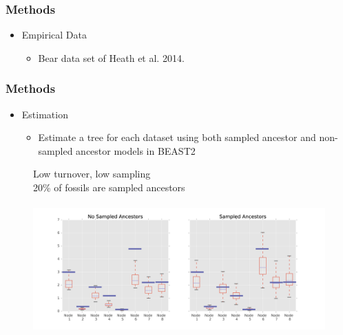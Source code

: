 \documentclass[]{beamer}
\begin{document}
\begin{frame}
\frametitle{Methods}
\begin{itemize}
\item Empirical Data
\begin{itemize}
\item Bear data set of Heath et al. 2014.
\end{itemize}
\end{itemize}
\end{frame}

\begin{frame}
\frametitle{Methods}
\begin{itemize}
\item Estimation
\begin{itemize}
\item Estimate a tree for each dataset using both sampled ancestor and non-sampled ancestor models in BEAST2
\end{itemize}
\end{itemize}
\end{frame}

\begin{frame}
\begin{center}
\begin{figure}
Low turnover, low sampling  \\
20\% of fossils are sampled ancestors \\
\mathlarger{\mu} \lambda  \psi   \rho \\
\includegraphics[scale=0.4]{images/LowTurnLowSampnodes.png}
\end{figure}
\end{center}
\end{frame}
\end{document}
